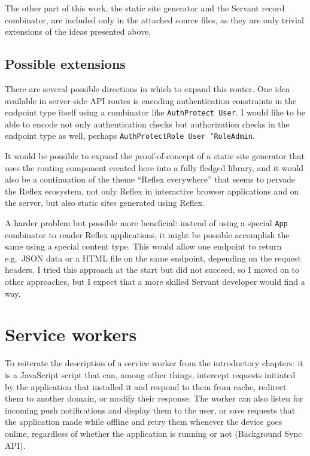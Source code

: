 \documentclass[english,zadani,odsaz]{fitthesis}
\begin{document}
The other part of this work, the static site generator and the Servant record
combinator, are included only in the attached source files, as they are only
trivial extensions of the ideas presented above.

\subsection{Possible extensions}
\label{sec:orgd6fa733}
There are several possible directions in which to expand this router. One idea
available in server-side API routes is encoding authentication constraints in
the endpoint type itself using a combinator like \texttt{AuthProtect User}. I would like
to be able to encode not only authentication checks but authorization checks in
the endpoint type as well, perhaps \texttt{AuthProtectRole User 'RoleAdmin}.

It would be possible to expand the proof-of-concept of a static site generator
that uses the routing component created here into a fully fledged library, and
it would also be a continuation of the theme ``Reflex everywhere'' that seems to
pervade the Reflex ecosystem, not only Reflex in interactive browser
applications and on the server, but also static sites generated using Reflex.

A harder problem but possible more beneficial: instead of using a special \texttt{App}
combinator to render Reflex applications, it might be possible accomplish the
same using a special content type. This would allow one endpoint to return
e.g.~JSON data or a HTML file on the same endpoint, depending on the request
headers. I tried this approach at the start but did not succeed, so I moved on
to other approaches, but I expect that a more skilled Servant developer would
find a way.

\section{Service workers}
\label{sec:org6977fd6}
To reiterate the description of a service worker from the introductory chapters:
it is a JavaScript script that can, among other things, intercept requests
initiated by the application that installed it and respond to them from cache,
redirect them to another domain, or modify their response. The worker can also
listen for incoming push notifications and display them to the user, or save
requests that the application made while offline and retry them whenever the
device goes online, regardless of whether the application is running or not
(Background Sync API).
\end{document}
